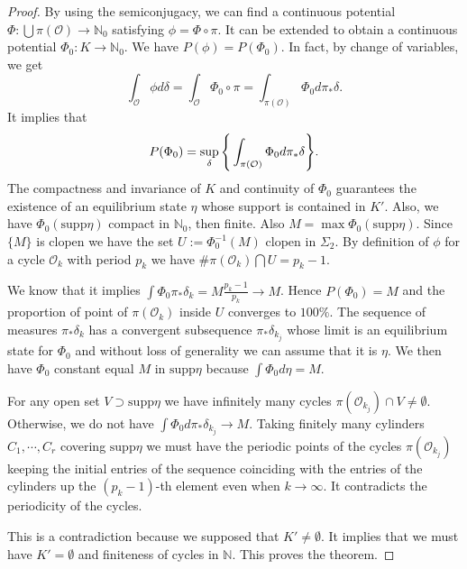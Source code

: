 \documentclass[10pt,a4paper]{amsart}
\begin{document}
\begin{proof}
	By using the semiconjugacy, we can find a continuous potential $\Phi: \bigcup \pi(\mathcal{O}) \to \mathbb{N}_{0}$ satisfying $\phi = \Phi \circ \pi$. It can be extended to obtain a continuous potential $\Phi_{0}: K \to \mathbb{N}_{0}$. We have $P(\phi) = P(\Phi_{0})$. In fact, by change of variables, we get
	\[
	\int_{\mathcal{O}} \phi d\delta = \int_{\mathcal{O}} \Phi_{0} \circ \pi = \int_{\pi(\mathcal{O})} \Phi_{0} d\pi_{*} \delta.
	\] 
	It implies that
	\[
	P(\Phi_{0}) = \sup_{\delta}\Bigg{\{} \int_{\pi(\mathcal{O})} \Phi_{0} d\pi_{*} \delta\Bigg{\}}.
	\]
	The compactness and invariance of $K$ and continuity of $\Phi_{0}$ guarantees the existence of an equilibrium state $\eta$ whose support is contained in $K'$. Also, we have $\Phi_{0}(\text{supp}\eta)$ compact in $\mathbb{N}_{0}$, then finite. Also $M = \max \Phi_{0}(\text{supp}\eta)$. Since $\{M\}$ is clopen we have the set $U := \Phi_{0}^{-1}(M)$ clopen in $\Sigma_{2}$. By definition of $\phi$ for a cycle $\mathcal{O}_{k}$  with period $p_{k}$ we have $\# \pi(\mathcal{O}_{k}) \bigcap U = p_{k}-1$.
	
	We know that it implies $\int \Phi_{0} \pi_{*} \delta_{k} = M\frac{p_{k} - 1}{p_{k}} \to M$. Hence $P(\Phi_{0}) = M$ and the proportion of point of $\pi(\mathcal{O}_{k})$ inside $U$ converges to $100\%$. The sequence of measures $\pi_{*}\delta_{k}$ has a convergent subsequence $\pi_{*}\delta_{k_{j}}$ whose limit is an equilibrium state for $\Phi_{0}$ and without loss of generality we can assume that it is $\eta$. We then have $\Phi_{0}$ constant equal $M$ in $\text{supp}\eta$ because $\int \Phi_{0} d\eta = M$. 
	
	For any open set $V \supset \text{supp}\eta$ we have infinitely many cycles $\pi(\mathcal{O}_{k_{j}}) \cap V \neq \emptyset$. Otherwise, we do not have $\int \Phi_{0} d\pi_{*}\delta_{k_{j}} \to M$. Taking finitely many cylinders $C_{1}, \cdots, C_{r}$ covering $\text{supp}\eta$ we must have the periodic points of the cycles  $\pi(\mathcal{O}_{k_{j}})$ keeping the initial entries  of the sequence coinciding with the entries of the cylinders up the $(p_{k} - 1)$-th element even when $k \to \infty$. It contradicts the periodicity of the cycles. 
	
	This is a contradiction because we supposed that $K'\neq \emptyset$. It implies that we must have $K' = \emptyset$ and finiteness of cycles in $\mathbb{N}$. This proves the theorem. 
\end{proof}
\end{document}
